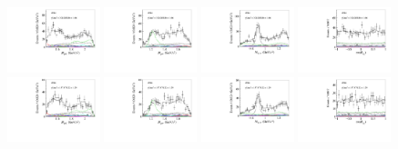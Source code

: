 \begin{figure}[htbp]
    \includegraphics[width=0.24\textwidth]{figure/pwa_nominal/s11_m_R_BC.pdf}
    \includegraphics[width=0.24\textwidth]{figure/pwa_nominal/s11_m_R_BD.pdf}
    \includegraphics[width=0.24\textwidth]{figure/pwa_nominal/s11_m_R_CD.pdf}
    \includegraphics[width=0.24\textwidth]{figure/pwa_nominal/s11_epemDSID_Lmdc_cos_beta.pdf} \\
    \includegraphics[width=0.24\textwidth]{figure/pwa_nominal/s12_m_R_BC.pdf}
    \includegraphics[width=0.24\textwidth]{figure/pwa_nominal/s12_m_R_BD.pdf}
    \includegraphics[width=0.24\textwidth]{figure/pwa_nominal/s12_m_R_CD.pdf}
    \includegraphics[width=0.24\textwidth]{figure/pwa_nominal/s12_epemDSID_Lmdc_cos_beta.pdf} \\

\end{figure}
